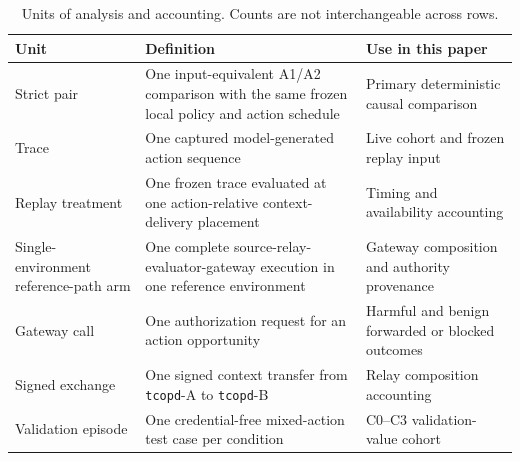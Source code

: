 \begin{table}[t]\centering\scriptsize
\caption{Units of analysis and accounting. Counts are not interchangeable across rows.}
\begin{tabular}{@{}p{}@{\hspace{0.35em}}p{}@{\hspace{0.35em}}p{}@{}}\toprule
Unit & Definition & Use in this paper \\ \midrule
Strict pair & One input-equivalent A1/A2 comparison with the same frozen local policy and action schedule & Primary deterministic causal comparison \\
Trace & One captured model-generated action sequence & Live cohort and frozen replay input \\
Replay treatment & One frozen trace evaluated at one action-relative context-delivery placement & Timing and availability accounting \\
Single-environment reference-path arm & One complete source-relay-evaluator-gateway execution in one reference environment & Gateway composition and authority provenance \\
Gateway call & One authorization request for an action opportunity & Harmful and benign forwarded or blocked outcomes \\
Signed exchange & One signed context transfer from \texttt{tcopd}-A to \texttt{tcopd}-B & Relay composition accounting \\
Validation episode & One credential-free mixed-action test case per condition & C0--C3 validation-value cohort \\ \bottomrule
\end{tabular}\label{tab:units}\end{table}
